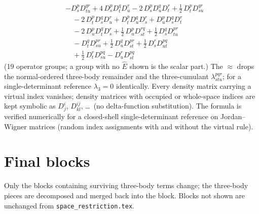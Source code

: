 \documentclass[11pt]{article}
\begin{document}
\begin{align}
&- D^{p}_{s} D^{qr}_{tu}  + 4\, D^{p}_{s} D^{q}_{t} D^{r}_{u}  - 2\, D^{p}_{s} D^{q}_{u} D^{r}_{t}  + \tfrac{1}{2}\, D^{p}_{t} D^{qr}_{su}  \\
&\quad - 2\, D^{p}_{t} D^{q}_{s} D^{r}_{u}  + D^{p}_{t} D^{q}_{u} D^{r}_{s}  + D^{p}_{u} D^{q}_{s} D^{r}_{t}  \\
&\quad - 2\, D^{p}_{u} D^{q}_{t} D^{r}_{s}  + \tfrac{1}{2}\, D^{p}_{u} D^{rq}_{st}  + \tfrac{1}{2}\, D^{q}_{s} D^{pr}_{tu}  \\
&\quad - D^{q}_{t} D^{pr}_{su}  + \tfrac{1}{2}\, D^{q}_{u} D^{pr}_{st}  + \tfrac{1}{2}\, D^{r}_{s} D^{pq}_{ut}  \\
&\quad + \tfrac{1}{2}\, D^{r}_{t} D^{pq}_{su}  - D^{r}_{u} D^{pq}_{st} 
\end{align}
(19 operator groups; a group with no $\hat{E}$ shown is the scalar part.)
The $\approx$ drops the normal-ordered three-body remainder and the three-cumulant $\lambda^{pqr}_{stu}$; for a single-determinant reference $\lambda_3 = 0$ identically. Every density matrix carrying a virtual index vanishes; density matrices with occupied or whole-space indices are kept symbolic as $D^i_j$, $D^{ij}_{kl}$, \dots\ (no delta-function substitution).  The formula is verified numerically for a closed-shell single-determinant reference on Jordan--Wigner matrices (random index assignments with and without the virtual rule).

\section{Final blocks}
Only the blocks containing surviving three-body terms change; the three-body pieces are decomposed and merged back into the block.  Blocks not shown are unchanged from \texttt{space\_restriction.tex}.
\end{document}
